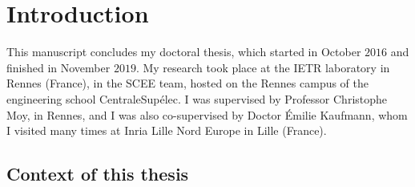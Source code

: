 
\chapter{Introduction}
\label{chapter:1}




\graphicspath{{2-Chapters/1-Chapter/Images/}}

%
This manuscript concludes my doctoral thesis, which started in October $2016$ and finished in November $2019$.
My research took place at the IETR laboratory in Rennes (France), in the SCEE team, hosted on the Rennes campus of the engineering school CentraleSupélec.
I was supervised by Professor Christophe Moy, in Rennes,
and I was also co-supervised by Doctor Émilie Kaufmann, whom I visited many times at Inria Lille Nord Europe in Lille (France).


\section{Context of this thesis}
\label{sec:1:problems}

